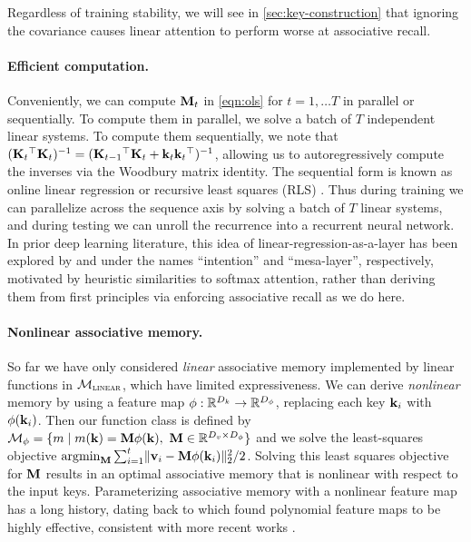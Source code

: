 \documentclass[notitlepage, 11pt]{article}
\newcommand*{\memory}{{m}}
\newcommand*{\dkey}{{D_k}}
\newcommand*{\dphi}{{D_\phi}}
\newcommand*{\dval}{{D_v}}
\newcommand*{\linearfunctions}{{\Mcal_{\textsc{linear}}}}
\begin{document}
Regardless of training stability, we will see in \autoref{sec:key-construction} that ignoring the covariance causes linear attention to perform worse at associative recall.

\paragraph{Efficient computation.}
Conveniently, we can compute $\mathbf{M}_t$ in \autoref{eqn:ols} for $t=1, \ldots T$ in parallel or sequentially.
To compute them in parallel, we solve a batch of $T$ independent linear systems.
To compute them sequentially, we note that $(\mathbf{K}_t{}^\top\mathbf{K}_t)^{-1} = (\mathbf{K}_{t-1}{}^\top \mathbf{K}_t + \mathbf{k}_t\mathbf{k}_t{}^\top)^{-1}$, allowing us to autoregressively compute the inverses via the Woodbury matrix identity.
The sequential form is known as online linear regression or recursive least squares (RLS) \citep{Haykin2014AdaptiveFilterTheory}. 
Thus during training we can parallelize across the sequence axis by solving a batch of $T$ linear systems, and during testing we can unroll the recurrence into a recurrent neural network.
In prior deep learning literature, this idea of linear-regression-as-a-layer has been explored by \citet{Garnelo2023ExploringSpaceKeyValueQuery} and \citet{vonOswald2023UncoveringMesaoptimizationAlgorithms} under the names ``intention'' and ``mesa-layer'', respectively, motivated by heuristic similarities to softmax attention, rather than deriving them from first principles via enforcing associative recall as we do here. 

\paragraph{Nonlinear associative memory.}
So far we have only considered \emph{linear} associative memory implemented by linear functions in $\linearfunctions$, which have limited expressiveness.
We can derive \emph{nonlinear} memory by using a feature map $\phi: \reals^\dkey \to \reals^\dphi$, replacing each key $\mathbf{k}_i$ with $\phi(\mathbf{k}_i)$.
Then our function class is defined by $\Mcal_{\phi} = \{\memory \mid \memory(\kbf) = \Mbf\phi(\kbf),\ \Mbf \in \reals^{\dval\times\dphi}\}$ and we solve the least-squares objective $\operatorname*{\arg\!\min}_{\mathbf{M}} \sum_{i=1}^t\lVert\mathbf{v}_i - \mathbf{M} \phi(\mathbf{k}_i)\rVert_2^2/2$.
Solving this least squares objective for $\mathbf{M}$ results in an optimal associative memory that is nonlinear with respect to the input keys.
Parameterizing associative memory with a nonlinear feature map has a long history, dating back to \citet{Poggio1975OptimalNonlinearAssociative} which found polynomial feature maps to be highly effective, consistent with more recent works \citep{Zhang2023HedgehogPorcupineExpressive,Arora2024SimpleLinearAttention}.
\end{document}
